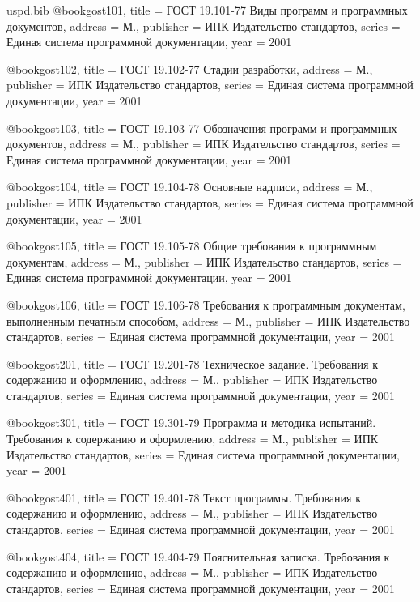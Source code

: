 \begin{filecontents}{uspd.bib}
@book{gost101,
  title = {ГОСТ 19.101-77 Виды программ и программных документов},
  address = {М.},
  publisher = {ИПК Издательство стандартов},
  series = {Единая система программной документации},
  year = {2001}
}

@book{gost102,
  title = {ГОСТ 19.102-77 Стадии разработки},
  address = {М.},
  publisher = {ИПК Издательство стандартов},
  series = {Единая система программной документации},
  year = {2001}
}

@book{gost103,
  title = {ГОСТ 19.103-77 Обозначения программ и программных документов},
  address = {М.},
  publisher = {ИПК Издательство стандартов},
  series = {Единая система программной документации},
  year = {2001}
}

@book{gost104,
  title = {ГОСТ 19.104-78 Основные надписи},
  address = {М.},
  publisher = {ИПК Издательство стандартов},
  series = {Единая система программной документации},
  year = {2001}
}

@book{gost105,
  title = {ГОСТ 19.105-78 Общие требования к программным документам},
  address = {М.},
  publisher = {ИПК Издательство стандартов},
  series = {Единая система программной документации},
  year = {2001}
}

@book{gost106,
  title = {ГОСТ 19.106-78 Требования к программным документам, выполненным печатным способом},
  address = {М.},
  publisher = {ИПК Издательство стандартов},
  series = {Единая система программной документации},
  year = {2001}
}

@book{gost201,
  title = {ГОСТ 19.201-78 Техническое задание. Требования к содержанию и оформлению},
  address = {М.},
  publisher = {ИПК Издательство стандартов},
  series = {Единая система программной документации},
  year = {2001}
}

@book{gost301,
  title = {ГОСТ 19.301-79 Программа и методика испытаний. Требования к содержанию и оформлению},
  address = {М.},
  publisher = {ИПК Издательство стандартов},
  series = {Единая система программной документации},
  year = {2001}
}

@book{gost401,
  title = {ГОСТ 19.401-78 Текст программы. Требования к содержанию и оформлению},
  address = {М.},
  publisher = {ИПК Издательство стандартов},
  series = {Единая система программной документации},
  year = {2001}
}

@book{gost404,
  title = {ГОСТ 19.404-79 Пояснительная записка. Требования к содержанию и оформлению},
  address = {М.},
  publisher = {ИПК Издательство стандартов},
  series = {Единая система программной документации},
  year = {2001}
}


\end{filecontents}
